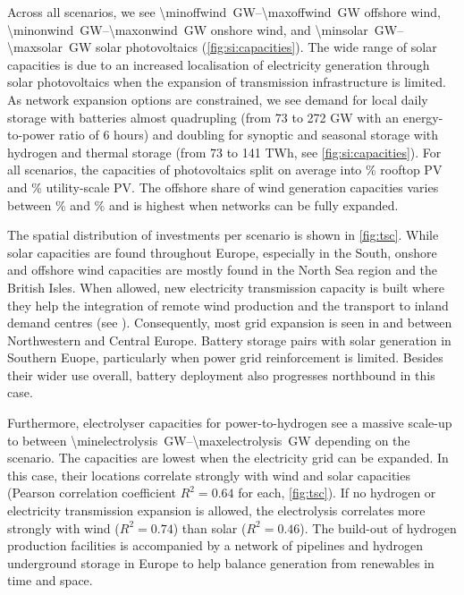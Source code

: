 Across all scenarios, we see \SIrange{\minoffwind}{\maxoffwind}{\giga\watt}
offshore wind, \SIrange{\minonwind}{\maxonwind}{\giga\watt} onshore wind, and
\SIrange{\minsolar}{\maxsolar}{\giga\watt} solar photovoltaics
(\cref{fig:si:capacities}). The wide range of solar capacities is due to an
increased localisation of electricity generation through solar photovoltaics
when the expansion of transmission infrastructure is limited. As network
expansion options are constrained, we see demand for local daily storage with
batteries almost quadrupling (from 73 to 272 GW with an energy-to-power ratio of
6 hours) and doubling for synoptic and seasonal storage with hydrogen and
thermal storage (from 73 to 141 TWh, see \cref{fig:si:capacities}). For all
scenarios, the capacities of photovoltaics split on average into
\meanrooftopshare\% rooftop PV and \meanutilityshare\% utility-scale PV. The
offshore share of wind generation capacities varies between \minoffshoreshare\%
and \maxoffshoreshare\% and is highest when networks can be fully expanded.

The spatial distribution of investments per scenario is shown in \cref{fig:tsc}.
While solar capacities are found throughout Europe, especially in the South,
onshore and offshore wind capacities are mostly found in the North Sea region
and the British Isles. When allowed, new electricity transmission capacity is
built where they help the integration of remote wind production and the
transport to inland demand centres (see ). Consequently, most
grid expansion is seen in and between Northwestern and Central Europe. Battery
storage pairs with solar generation in Southern Euope, particularly when power
grid reinforcement is limited. Besides their wider use overall, battery
deployment also progresses northbound in this case.

Furthermore, electrolyser capacities for power-to-hydrogen see a massive
scale-up to between \SIrange{\minelectrolysis}{\maxelectrolysis}{\giga\watt}
depending on the scenario. The capacities are lowest when the electricity grid
can be expanded. In this case, their locations correlate strongly with wind and
solar capacities (Pearson correlation coefficient $R^2=0.64$ for each,
\cref{fig:tsc}). If no hydrogen or electricity transmission expansion is
allowed, the electrolysis correlates more strongly with wind ($R^2=0.74$) than
solar ($R^2=0.46$). The build-out of hydrogen production facilities is
accompanied by a network of pipelines and hydrogen underground storage in Europe
to help balance generation from renewables in time and space.

